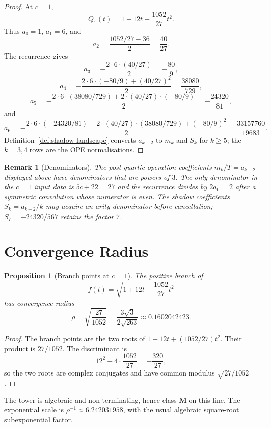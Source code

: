 \documentclass[11pt]{article}
\newtheorem{proposition}[theorem]{Proposition}
\newtheorem{remark}[theorem]{Remark}
\begin{document}
\begin{proof}
At $c=1$,
\[
  Q_1(t)=1+12t+\frac{1052}{27}t^2.
\]
Thus $a_0=1$, $a_1=6$, and
\[
  a_2=\frac{1052/27-36}{2}=\frac{40}{27}.
\]
The recurrence gives
\[
  a_3=-\frac{2\cdot6\cdot(40/27)}2=-\frac{80}{9},
\]
\[
  a_4=-\frac{2\cdot6\cdot(-80/9)+(40/27)^2}{2}
      =\frac{38080}{729},
\]
\[
  a_5=-\frac{2\cdot6\cdot(38080/729)
        +2\cdot(40/27)\cdot(-80/9)}2
      =-\frac{24320}{81},
\]
and
\[
  a_6=-\frac{2\cdot6\cdot(-24320/81)
        +2\cdot(40/27)\cdot(38080/729)
        +(-80/9)^2}{2}
      =\frac{33157760}{19683}.
\]
Definition~\ref{def:shadow-landscape} converts $a_{k-2}$ to $m_k$ and
$S_k$ for $k\geq5$; the $k=3,4$ rows are the OPE normalisations.
\end{proof}

\begin{remark}[Denominators]
\label{rem:denominators}
The post-quartic operation coefficients $m_k/T=a_{k-2}$ displayed
above have denominators that are powers of $3$. The only denominator in
the $c=1$ input data is $5c+22=27$ and the recurrence divides by
$2a_0=2$ after a symmetric convolution whose numerator is even. The
shadow coefficients $S_k=a_{k-2}/k$ may acquire an arity denominator
before cancellation; $S_7=-24320/567$ retains the factor $7$.
\end{remark}

\section{Convergence Radius}

\begin{proposition}[Branch points at $c=1$]
\label{prop:convergence-radius}
The positive branch of
\[
  f(t)=\sqrt{1+12t+\frac{1052}{27}t^2}
\]
has convergence radius
\[
  \rho=\sqrt{\frac{27}{1052}}
       =\frac{3\sqrt3}{2\sqrt{263}}
       \approx 0.1602042423.
\]
\end{proposition}

\begin{proof}
The branch points are the two roots of
$1+12t+(1052/27)t^2$. Their product is $27/1052$. The discriminant is
\[
  12^2-4\cdot\frac{1052}{27}
  =-\frac{320}{27},
\]
so the two roots are complex conjugates and have common modulus
$\sqrt{27/1052}$.
\end{proof}

The tower is algebraic and non-terminating, hence class $\mathbf M$ on
this line. The exponential scale is $\rho^{-1}\approx6.242031958$,
with the usual algebraic square-root subexponential factor.
\end{document}
